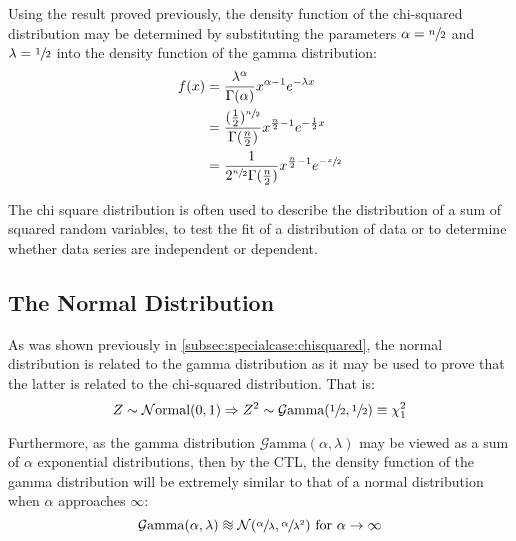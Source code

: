 \documentclass[12pt]{article}
\newcommand{\G}{\mathcal{G}}
\newcommand{\N}{\mathcal{N}}
\begin{document}
Using the result proved previously, the density function of the chi-squared distribution may be determined by
substituting the parameters $\alpha = \sfrac{n}{2}$ and $\lambda = \sfrac{1}{2}$ into the density function of the gamma
distribution:
\begin{equation}\label{eq:chisquared-density}
	\begin{split}
		f(x)	&=	\frac{\lambda^\alpha}{\Gamma(\alpha)}x^{\alpha-1}e^{-\lambda x}\\
				&=	\frac{(\frac{1}{2})^{\sfrac{n}{2}}}{\Gamma(\frac{n}{2})}x^{\frac{n}{2}-1}e^{-\frac{1}{2}x}\\
				&=	\frac{1}{2^{\sfrac{n}{2}}\Gamma(\frac{n}{2})}x^{\frac{n}{2}-1}e^{-\sfrac{x}{2}}
	\end{split}
\end{equation}


The chi square distribution is often used to describe the distribution of a sum of squared random variables, to test the
fit of a distribution of data or to determine whether data series are independent or dependent.

\subsection{The Normal Distribution }
As was shown previously in \autoref{subsec:specialcase:chisquared}, the normal distribution is related to the gamma
distribution as it may be used to prove that the latter is related to the chi-squared distribution. That is:
\begin{equation}
	Z\sim\N\text{ormal}(0, 1)\Rightarrow Z^2\sim\G\text{amma}(\sfrac{1}{2}, \sfrac{1}{2})\equiv\chi^2_1
\end{equation}

Furthermore, as the gamma distribution $\G\text{amma}(\alpha, \lambda)$ may be viewed as a sum of $\alpha$ exponential
distributions, then by the CTL, the density function of the gamma distribution will be extremely similar to that of a
normal distribution when $\alpha$ approaches $\infty$:
\begin{equation}
	\G\text{amma}(\alpha, \lambda) \approxequiv \N(\sfrac{\alpha}{\lambda}, \sfrac{\alpha}{\lambda^2})\text{ for }\alpha\to\infty
\end{equation}
\end{document}

